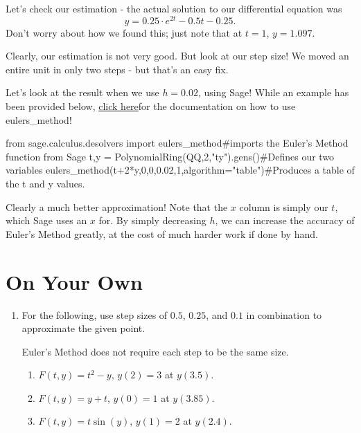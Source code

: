 \documentclass{ximera}
\begin{document}
Let's check our estimation - the actual solution to our differential equation was $$y = 0.25\cdot e^{2t}-0.5t-0.25\text{.}$$ Don't worry about how we found this; just note that at $t=1$, $y = 1.097$.

Clearly, our estimation is not very good. But look at our step size! We moved an entire unit in only two steps - but that's an easy fix.

Let's look at the result when we use $h = 0.02$, using Sage! While an example has been provided below, \href{http://doc.sagemath.org/html/en/reference/calculus/sage/calculus/desolvers.html#sage.calculus.desolvers.eulers\_method}{click here}for the documentation on how to use eulers\_method!
\begin{onlineOnly}
\begin{sageCell}
from sage.calculus.desolvers import eulers_method#imports the Euler's Method function from Sage
t,y = PolynomialRing(QQ,2,"ty").gens()#Defines our two variables
eulers_method(t+2*y,0,0,0.02,1,algorithm="table")#Produces a table of the t and y values.
\end{sageCell}
\end{onlineOnly}

Clearly a much better approximation! Note that the $x$ column is simply our $t$, which Sage uses an $x$ for. By simply decreasing $h$, we can increase the accuracy of Euler's Method greatly, at the cost of much harder work if done by hand.

\section{On Your Own}

\begin{enumerate}
\item For the following, use step sizes of $0.5$, $0.25$, and $0.1$ in combination to approximate the given point. 

\begin{remark}
Euler's Method does not require each step to be the same size.
\end{remark}
\begin{enumerate}
\item $F(t,y) = t^2 -y$, $y(2) = 3$ at $y(3.5)$.
\item $F(t,y) = y+t$, $y(0)=1$ at $y(3.85)$.
\item $F(t,y) = t\sin(y)$, $y(1) = 2$ at $y(2.4)$.
\end{enumerate}
\end{enumerate}
\end{document}
